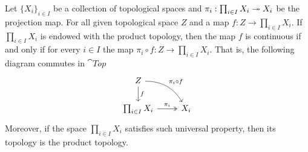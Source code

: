 \begin{theorem}
  \label{thm: prod top universal prop}
  Let \(\{X_i\}_{i \in I}\) be a collection of topological spaces and \(\pi_i:
  \prod_{i \in I} X_i \twoheadrightarrow  X_i\) be the projection map. For all given
  topological space \(Z\) and a map \(f: Z \to \prod_{i \in I} X_i\). If
  \(\prod_{i \in I} X_i\) is endowed with the product topology, then the map
  \(f\) is continuous if and only if for every \(i \in I\) the map \(\pi_i \circ
  f: Z \to \prod_{i \in I} X_i\). That is, the following diagram commutes in
  \(\cat{Top}\)
  \[
    \begin{tikzcd}
      Z \ar[d, "f"] \ar[dr, bend left, "\pi_i \circ f"] \\
      \prod_{i \in I} X_i \ar[r, two heads, "\pi_i"] &X_i
    \end{tikzcd}
  \]     
  Moreover, if the space \(\prod_{i \in I} X_i\) satisfies such universal
  property, then its topology is the product topology.
\end{theorem}

